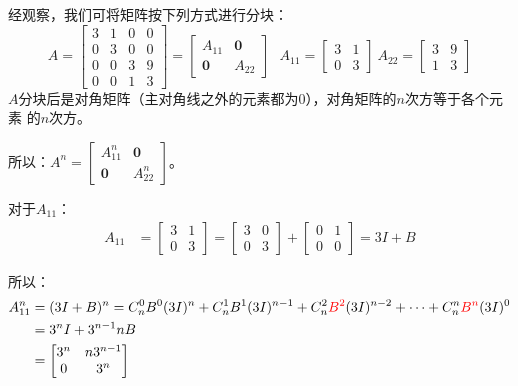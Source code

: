 \documentclass{article}
\begin{document}
\begin{jie}
经观察，我们可将矩阵按下列方式进行分块：
\begin{equation*}
A=
\begin{bmatrix}
3&1&0&0\\
 0&3&0&0\\
 0&0&3&9\\
 0&0&1&3
\end{bmatrix}
=
\begin{bmatrix}
  A_{11} & \mathbf{0} \\
  \mathbf{0} & A_{22}
\end{bmatrix}~~~
A_{11}=
\begin{bmatrix}
  3 & 1 \\
  0 & 3
\end{bmatrix}
~A_{22}=
\begin{bmatrix}
  3 & 9 \\
  1 & 3
\end{bmatrix}
\end{equation*}
$A$分块后是对角矩阵（主对角线之外的元素都为0），对角矩阵的$n$次方等于各个元素 的$n$次方。

所以：$A^{n}=\begin{bmatrix}
  A_{11}^{n} & \mathbf{0} \\
  \mathbf{0} & A_{22}^{n}
\end{bmatrix}$。

对于$A_{11}$：
\begin{align*}A_{11}&=
\begin{bmatrix}
  3 & 1 \\
  0 & 3
\end{bmatrix}=
\begin{bmatrix}
  3 & 0 \\
  0 & 3
\end{bmatrix}+
\begin{bmatrix}
  0 & 1 \\
  0 & 0
\end{bmatrix}=3I+B
\end{align*}

所以：
\begin{align*}
A^{n}_{11}&=(3I+B)^{n}=C_{n}^{0}B^{0}(3I)^{n}+C_{n}^{1}B^{1}(3I)^{n-1}+C_{n}^{2}\textcolor[rgb]{1.00,0.00,0.00}{B^{2}}(3I)^{n-2}+\cdots+C_{n}^{n}\textcolor[rgb]{1.00,0.00,0.00}{B^{n}}(3I)^{0}\\
&=3^{n}I+3^{n-1}nB\\
&=\begin{bmatrix}
  3^{n} & n3^{n-1} \\
  0 & 3^{n}
\end{bmatrix}
\end{align*}
\end{jie}
\end{document}
